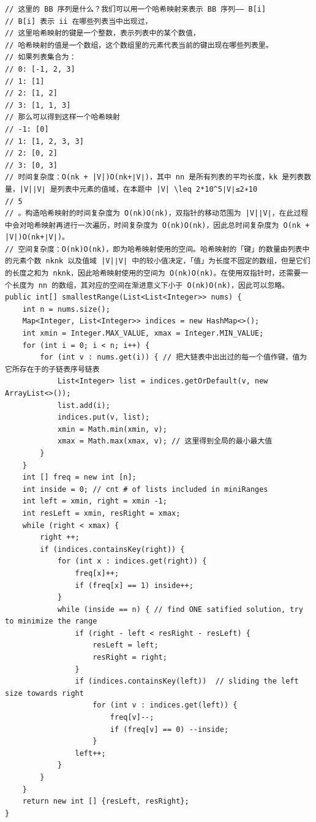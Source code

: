 \documentclass[9pt, b5paper]{article}
\begin{document}
\begin{verbatim}
// 这里的 BB 序列是什么？我们可以用一个哈希映射来表示 BB 序列—— B[i]
// B[i] 表示 ii 在哪些列表当中出现过，
// 这里哈希映射的键是一个整数，表示列表中的某个数值，
// 哈希映射的值是一个数组，这个数组里的元素代表当前的键出现在哪些列表里。
// 如果列表集合为：
// 0: [-1, 2, 3]
// 1: [1]
// 2: [1, 2]
// 3: [1, 1, 3]
// 那么可以得到这样一个哈希映射
// -1: [0]
// 1: [1, 2, 3, 3]
// 2: [0, 2]
// 3: [0, 3]
// 时间复杂度：O(nk + |V|)O(nk+∣V∣)，其中 nn 是所有列表的平均长度，kk 是列表数量，|V|∣V∣ 是列表中元素的值域，在本题中 |V| \leq 2*10^5∣V∣≤2∗10 
// 5
// 。构造哈希映射的时间复杂度为 O(nk)O(nk)，双指针的移动范围为 |V|∣V∣，在此过程中会对哈希映射再进行一次遍历，时间复杂度为 O(nk)O(nk)，因此总时间复杂度为 O(nk + |V|)O(nk+∣V∣)。
// 空间复杂度：O(nk)O(nk)，即为哈希映射使用的空间。哈希映射的「键」的数量由列表中的元素个数 nknk 以及值域 |V|∣V∣ 中的较小值决定，「值」为长度不固定的数组，但是它们的长度之和为 nknk，因此哈希映射使用的空间为 O(nk)O(nk)。在使用双指针时，还需要一个长度为 nn 的数组，其对应的空间在渐进意义下小于 O(nk)O(nk)，因此可以忽略。
public int[] smallestRange(List<List<Integer>> nums) {
    int n = nums.size();
    Map<Integer, List<Integer>> indices = new HashMap<>();
    int xmin = Integer.MAX_VALUE, xmax = Integer.MIN_VALUE;
    for (int i = 0; i < n; i++) {
        for (int v : nums.get(i)) { // 把大链表中出出过的每一个值作键，值为它所存在于的子链表序号链表
            List<Integer> list = indices.getOrDefault(v, new ArrayList<>());
            list.add(i);
            indices.put(v, list);
            xmin = Math.min(xmin, v);
            xmax = Math.max(xmax, v); // 这里得到全局的最小最大值
        }
    }
    int [] freq = new int [n];
    int inside = 0; // cnt # of lists included in miniRanges
    int left = xmin, right = xmin -1;
    int resLeft = xmin, resRight = xmax;
    while (right < xmax) {
        right ++;
        if (indices.containsKey(right)) {
            for (int x : indices.get(right)) {
                freq[x]++;
                if (freq[x] == 1) inside++;
            }
            while (inside == n) { // find ONE satified solution, try to minimize the range
                if (right - left < resRight - resLeft) {
                    resLeft = left;
                    resRight = right;
                }
                if (indices.containsKey(left))  // sliding the left size towards right
                    for (int v : indices.get(left)) {
                        freq[v]--;
                        if (freq[v] == 0) --inside;
                    }
                left++;
            }
        }
    }
    return new int [] {resLeft, resRight};
}
\end{verbatim}
\end{document}

